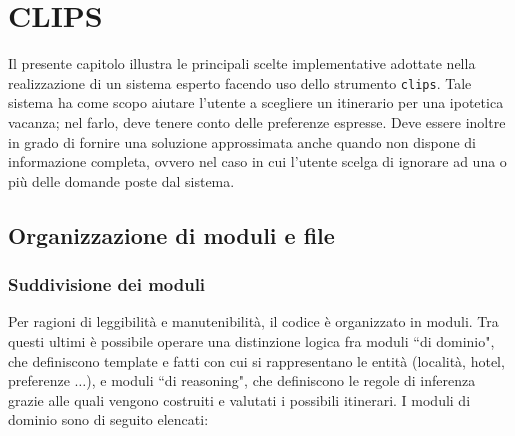 \chapter{CLIPS}

Il presente capitolo illustra le principali scelte implementative adottate nella realizzazione di un sistema esperto facendo uso dello strumento \texttt{clips}. Tale sistema ha come scopo aiutare l'utente a scegliere un itinerario per una ipotetica vacanza; nel farlo, deve tenere conto delle preferenze espresse. Deve essere inoltre in grado di fornire una soluzione approssimata anche quando non dispone di informazione completa, ovvero nel caso in cui l'utente scelga di ignorare ad una o più delle domande poste dal sistema.

\section{Organizzazione di moduli e file}

\subsection{Suddivisione dei moduli}

Per ragioni di leggibilità e manutenibilità, il codice è organizzato in moduli. Tra questi ultimi è possibile operare una distinzione logica fra moduli ``di dominio", che definiscono template e fatti con cui si rappresentano le entità (località, hotel, preferenze $\dots$), e moduli ``di reasoning", che definiscono le regole di inferenza grazie alle quali vengono costruiti e valutati i possibili itinerari. 
I moduli di dominio sono di seguito elencati:


